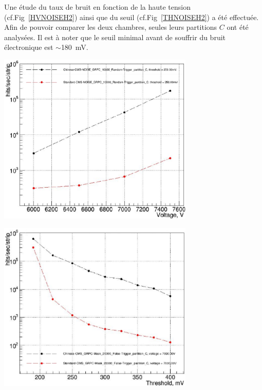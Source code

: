 Une étude du taux de bruit en fonction de la haute tension (cf.Fig~\ref{HVNOISEH2}) ainsi que du seuil (cf.Fig~\ref{THNOISEH2}) a été effectuée. Afin de pouvoir comparer les deux chambres, seules leurs partitions $C$ ont été analysées.
Il est à noter que le seuil minimal avant de souffrir du bruit électronique est $\sim$\SI{180}{\milli\volt}.

\noindent
\begin{minipage}[th!]{0.98\textwidth}
	\noindent
	\centering
	\includegraphics[width=0.70\textwidth]{GLA/HVNOISEH2.png}
	\captionsetup{type=figure}\caption{Taux de bruit des partitions $C$ des chambres en fonction de la tension appliquée. Le seuil est fixé à \SI{250}{\milli\volt}. La chambre en verre standard (de basse résitivité) est en rouge (noir).}
	\label{HVNOISEH2}
\end{minipage}%


\noindent
\begin{minipage}[th!]{0.98\textwidth}
	\noindent
	\centering
	\includegraphics[width=0.70\textwidth]{GLA/THNOISEH2.png}
	\captionsetup{type=figure}\caption{Taux de bruit des partitions $C$ des chambres en fonction du seuil appliqué. La tension appliquée est fixée à \SI{7000}{\volt}. La chambre en verre standard (de basse résitivité) est en rouge (noir).}
	\label{THNOISEH2}
\end{minipage}%

